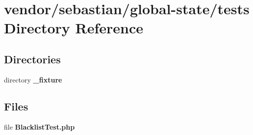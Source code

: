 \section{vendor/sebastian/global-\/state/tests Directory Reference}
\label{dir_33d9a8402a06883bb98dcd8993c93b35}
\subsection*{Directories}
\begin{DoxyCompactItemize}
\item 
directory {\bf \+\_\+fixture}
\end{DoxyCompactItemize}
\subsection*{Files}
\begin{DoxyCompactItemize}
\item 
file {\bf Blacklist\+Test.\+php}
\end{DoxyCompactItemize}
